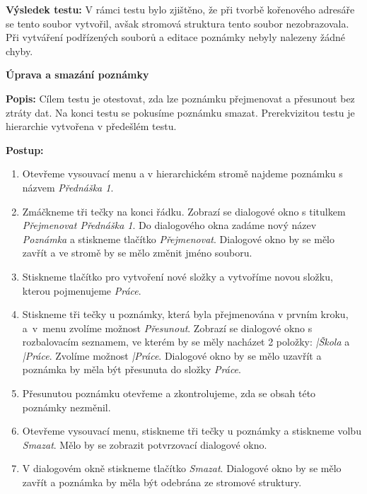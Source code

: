 \documentclass[czech, bc, kiv, he, iso690numb]{fasthesis}
\begin{document}
\noindent \textbf{Výsledek testu:} V rámci testu bylo zjištěno, že při tvorbě kořenového adresáře se tento soubor vytvořil, avšak stromová struktura tento soubor nezobrazovala. Při vytváření podřízených souborů a editace poznámky nebyly nalezeny žádné chyby. 

\vspace{0.1cm}


\noindent \textbf{Úprava a smazání poznámky}

\vspace{0.1cm}

\noindent \textbf{Popis:} Cílem testu je otestovat, zda lze poznámku přejmenovat a přesunout bez ztráty dat. Na konci testu se pokusíme poznámku smazat. Prerekvizitou testu je hierarchie vytvořena v předešlém testu.

\vspace{0.1cm}

\noindent \textbf{Postup:}

\begin{enumerate}[label=\arabic*., itemsep=0pt, topsep=0pt, parsep=0pt]
    \item Otevřeme vysouvací menu a v hierarchickém stromě najdeme poznámku s názvem \textit{Přednáška 1}.
    \item Zmáčkneme tři tečky na konci řádku. Zobrazí se dialogové okno s titulkem \textit{Přejmenovat Přednáška 1}. Do dialogového okna zadáme nový název \textit{Poznámka} a stiskneme tlačítko \textit{Přejmenovat}. Dialogové okno by se mělo zavřít a ve stromě by se mělo změnit jméno souboru.
    \item Stiskneme tlačítko pro vytvoření nové složky a vytvoříme novou složku, kterou pojmenujeme \textit{Práce}.
    \item Stiskneme tři tečky u poznámky, která byla přejmenována v prvním kroku, a~v~menu zvolíme možnost \textit{Přesunout}. Zobrazí se dialogové okno s rozbalovacím seznamem, ve kterém by se měly nacházet 2 položky: \textit{|Škola} a \textit{|Práce}. Zvolíme možnost \textit{|Práce}. Dialogové okno by se mělo uzavřít a poznámka by měla být přesunuta do složky \textit{Práce}.
    \item Přesunutou poznámku otevřeme a zkontrolujeme, zda se obsah této poznámky nezměnil.
    \item Otevřeme vysouvací menu, stiskneme tři tečky u poznámky a stiskneme volbu \textit{Smazat}. Mělo by se zobrazit potvrzovací dialogové okno.
    \item V dialogovém okně stiskneme tlačítko \textit{Smazat}. Dialogové okno by se mělo zavřít a poznámka by měla být odebrána ze stromové struktury. 
\end{enumerate}
\end{document}
